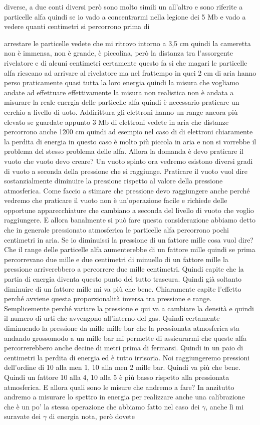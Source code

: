 diverse, a due conti diversi però sono molto simili un all'altro e sono riferite a particelle alfa quindi se io vado a concentrarmi nella legione dei 5 Mb e vado a vedere quanti centimetri si percorrono prima di 

arrestare le particelle vedete che mi ritrovo intorno a 3,5 cm quindi la cameretta non è immensa, non è grande, è piccolina, però la distanza tra l'assorgente rivelatore e di alcuni centimetri certamente questo fa sì che magari le particelle alfa riescano ad arrivare al rivelatore ma nel frattempo in quei 2 cm di aria hanno perso praticamente quasi tutta la loro energia quindi la misura che vogliamo andate ad effettuare effettivamente la misura non realistica non è andata a misurare la reale energia delle particelle alfa quindi è necessario praticare un cerchio a livello di uoto. Addirittura gli elettroni hanno un range ancora più elevato se guardate appunto 3 Mb di elettroni vedete in aria che distanze percorrono anche 1200 cm quindi ad esempio nel caso di di elettroni chiaramente la perdita di energia in questo caso è molto più piccola in aria e non si vorrebbe il problema del stesso problema delle alfa. Allora la domanda è devo praticare il vuoto che vuoto devo creare? Un vuoto spinto ora vedremo esistono diversi gradi di vuoto a seconda della pressione che si raggiunge. Praticare il vuoto vuol dire sostanzialmente diminuire la pressione rispetto al valore della pressione atmosferica. Come faccio a stimare che pressione devo raggiungere anche perché vedremo che praticare il vuoto non è un'operazione facile e richiede delle opportune apparecchiature che cambiano a seconda del livello di vuoto che voglio raggiungere. E allora banalmente si può fare questa considerazione abbiamo detto che in generale pressionato atmosferica le particelle alfa percorrono pochi centimetri in aria. Se io diminuissi la pressione di un fattore mille cosa vuol dire? Che il range delle particelle alfa aumenterebbe di un fattore mille quindi se prima percorrevano due mille e due centimetri di minuello di un fattore mille la pressione arriverebbero a percorrere due mille centimetri. Quindi capite che la partia di energia diventa questo punto del tutto trascura. Quindi già soltanto diminuire di un fattore mille mi va più che bene. Chiaramente capite l'effetto perché avviene questa proporzionalità inversa tra pressione e range. Semplicemente perché variare la pressione e qui va a cambiare la densità e quindi il numero di urti che avvengono all'interno del gas. Quindi certamente diminuendo la pressione da mille mille bar che la pressionata atmosferica sta andando grossomodo a un mille bar mi permette di assicurarmi che queste alfa percorrerebbero anche decine di metri prima di fermarsi. Quindi in un paio di centimetri la perdita di energia ed è tutto irrisoria. Noi raggiungeremo pressioni dell'ordine di 10 alla men 1, 10 alla men 2 mille bar. Quindi va più che bene. Quindi un fattore 10 alla 4, 10 alla 5 è più basso rispetto alla pressionata atmosferica. E allora quali sono le misure che andremo a fare? In anzitutto andremo a misurare lo spettro in energia per realizzare anche una calibrazione che è un po' la stessa operazione che abbiamo fatto nel caso dei $\gamma$, anche lì mi suravate dei $\gamma$ di energia nota, però dovete 